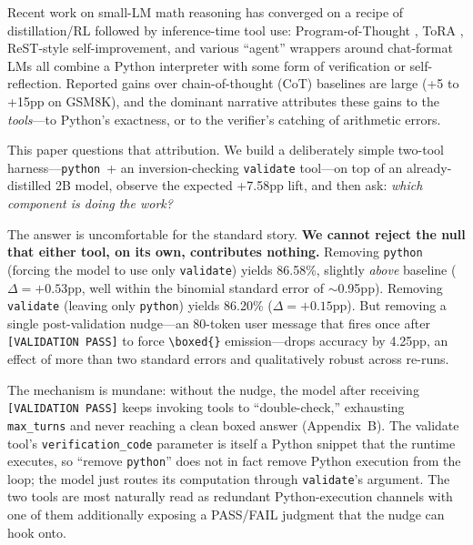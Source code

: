 \documentclass[10pt]{article}
\begin{document}
Recent work on small-LM math reasoning has converged on a recipe of distillation/RL followed by inference-time tool use: Program-of-Thought \citep{pot}, ToRA \citep{tora}, ReST-style self-improvement, and various ``agent'' wrappers around chat-format LMs all combine a Python interpreter with some form of verification or self-reflection. Reported gains over chain-of-thought (CoT) baselines are large (+5 to +15pp on GSM8K), and the dominant narrative attributes these gains to the \emph{tools}---to Python's exactness, or to the verifier's catching of arithmetic errors.

This paper questions that attribution. We build a deliberately simple two-tool harness---\texttt{python}~+ an inversion-checking \texttt{validate} tool---on top of an already-distilled 2B model, observe the expected +7.58pp lift, and then ask: \emph{which component is doing the work?}

The answer is uncomfortable for the standard story. \textbf{We cannot reject the null that either tool, on its own, contributes nothing.} Removing \texttt{python} (forcing the model to use only \texttt{validate}) yields 86.58\%, slightly \emph{above} baseline ($\Delta{=}+0.53$pp, well within the binomial standard error of $\sim$0.95pp). Removing \texttt{validate} (leaving only \texttt{python}) yields 86.20\% ($\Delta{=}+0.15$pp). But removing a single post-validation nudge---an 80-token user message that fires once after \texttt{[VALIDATION PASS]} to force \texttt{\textbackslash boxed\{\}} emission---drops accuracy by 4.25pp, an effect of more than two standard errors and qualitatively robust across re-runs.

The mechanism is mundane: without the nudge, the model after receiving \texttt{[VALIDATION PASS]} keeps invoking tools to ``double-check,'' exhausting \texttt{max\_turns} and never reaching a clean boxed answer (Appendix~B). The validate tool's \texttt{verification\_code} parameter is itself a Python snippet that the runtime executes, so ``remove \texttt{python}'' does not in fact remove Python execution from the loop; the model just routes its computation through \texttt{validate}'s argument. The two tools are most naturally read as redundant Python-execution channels with one of them additionally exposing a PASS/FAIL judgment that the nudge can hook onto.
\end{document}
